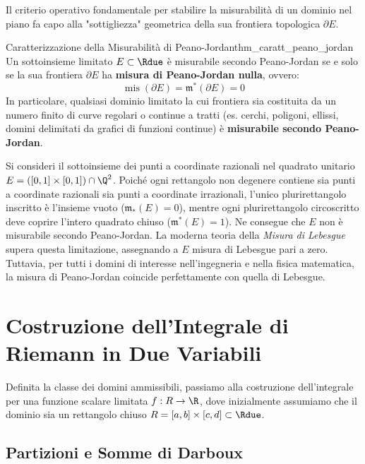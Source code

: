 Il criterio operativo fondamentale per stabilire la misurabilità di un dominio nel piano fa capo alla "sottigliezza" geometrica della sua frontiera topologica $\partial E$.

\begin{teorema}{Caratterizzazione della Misurabilità di Peano-Jordan}{thm_caratt_peano_jordan}
Un sottoinsieme limitato $E \subset \Rdue$ è misurabile secondo Peano-Jordan se e solo se la sua frontiera $\partial E$ ha \textbf{misura di Peano-Jordan nulla}, ovvero:
\[
\operatorname{mis}(\partial E) = \mathfrak{m}^*(\partial E) = 0
\]
In particolare, qualsiasi dominio limitato la cui frontiera sia costituita da un numero finito di curve regolari o continue a tratti (es. cerchi, poligoni, ellissi, domini delimitati da grafici di funzioni continue) è \textbf{misurabile secondo Peano-Jordan}.
\end{teorema}

\begin{osservazione}
Si consideri il sottoinsieme dei punti a coordinate razionali nel quadrato unitario $E = ([0,1] \times [0,1]) \cap \Q^2$. Poiché ogni rettangolo non degenere contiene sia punti a coordinate razionali sia punti a coordinate irrazionali, l'unico plurirettangolo inscritto è l'insieme vuoto ($\mathfrak{m}_*(E) = 0$), mentre ogni plurirettangolo circoscritto deve coprire l'intero quadrato chiuso ($\mathfrak{m}^*(E) = 1$). Ne consegue che $E$ non è misurabile secondo Peano-Jordan. La moderna teoria della \textit{Misura di Lebesgue} supera questa limitazione, assegnando a $E$ misura di Lebesgue pari a zero. Tuttavia, per tutti i domini di interesse nell'ingegneria e nella fisica matematica, la misura di Peano-Jordan coincide perfettamente con quella di Lebesgue.
\end{osservazione}

\section{Costruzione dell'Integrale di Riemann in Due Variabili}

Definita la classe dei domini ammissibili, passiamo alla costruzione dell'integrale per una funzione scalare limitata $f: R \to \R$, dove inizialmente assumiamo che il dominio sia un rettangolo chiuso $R = [a,b] \times [c,d] \subset \Rdue$.

\subsection{Partizioni e Somme di Darboux}

